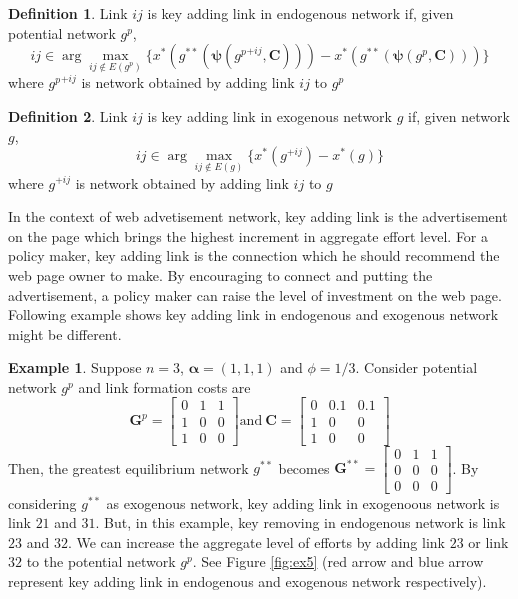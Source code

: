 \documentclass[12pt]{article}
\theoremstyle{definition}
\newtheorem{definition}{Definition}
\newtheorem{example}{Example}
\begin{document}
\begin{definition}
	Link $ij$ is key adding link in endogenous network if, given potential network $g^p$,
    \[ ij \in \arg \max_{ij \notin E(g^p)} \{ x^*(g^{**}(\bm{\psi}({g^p}^{+ij}, \bm{C}))) - x^*(g^{**}(\bm{\psi}(g^p, \bm{C}))) \} \]
    where ${g^p}^{+ij}$ is network obtained by adding link $ij$ to $g^p$
\end{definition}

\begin{definition}
	Link $ij$ is key adding link in exogenous network $g$ if, given network $g$,
    \[ ij \in \arg \max_{ij \notin E(g)} \{ x^*(g^{+ij}) - x^*(g) \} \]
    where $g^{+ij}$ is network obtained by adding link $ij$ to $g$
\end{definition}

In the context of web advetisement network, key adding link is the advertisement on the page which brings the highest increment in aggregate effort level.
For a policy maker, key adding link is the connection which he should recommend the web page owner to make.
By encouraging to connect and putting the advertisement, a policy maker can raise the level of investment on the web page.
Following example shows key adding link in endogenous and exogenous network might be different.

\begin{example}
Suppose $n=3$, $\bm{\alpha} = (1,1,1)$ and $\phi = 1/3$.
Consider potential network $g^p$ and link formation costs are
\[
\bm{G}^p = \left[
            \begin{array}{ccc}
                0 & 1 & 1 \\
                1 & 0 & 0 \\
                1 & 0 & 0
            \end{array} \right]
\text{and} \ 
\bm{C} = \left[
                \begin{array}{ccc}
                    0 & 0.1 & 0.1 \\
                    1 & 0 & 0 \\
                    1 & 0 & 0
                \end{array} \right] \]
Then, the greatest equilibrium network $g^{**}$ becomes
$\bm{G}^{**} = \left[
    \begin{array}{ccc}
        0 & 1 & 1 \\
        0 & 0 & 0 \\
        0 & 0 & 0
    \end{array} \right]$.
By considering $g^{**}$ as exogenous network, key adding link in exogenoous network is link $21$ and $31$.
But, in this example, key removing in endogenous network is link $23$ and $32$.
We can increase the aggregate level of efforts by adding link $23$ or link $32$ to the potential network $g^p$.
See Figure \ref{fig:ex5} (red arrow and blue arrow represent key adding link in endogenous and exogenous network respectively).
\end{example}
\end{document}
